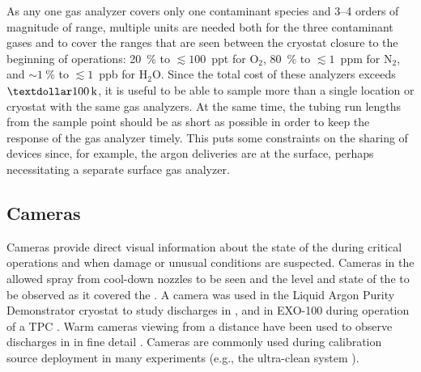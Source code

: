 As any one gas analyzer covers only one contaminant species and \numrange{3}{4} orders of magnitude of range, multiple units are needed both for the three contaminant gases and to cover the ranges that are seen between the cryostat closure to the beginning of  operations:
\SI{20}{\percent} to $\lesssim 100$~ppt for $\text{O}_2$,
\SI{80}{\percent} to $\lesssim 1$~ppm for $\text{N}_2$, and
$\sim \SI{1}{\percent}$ to $\lesssim 1$~ppb for $\text{H}_2\text{O}$.
Since the total cost of these analyzers exceeds $\SI{100}[\textdollar]{k}$, it is useful to be able to  sample more than a single location or cryostat with the same gas analyzers. At the same time, the tubing run lengths from the sample point should be as short as possible in order to keep the response of the gas analyzer timely. This puts some constraints on the sharing of devices since, for example, the argon deliveries are at the surface, perhaps necessitating a separate surface gas analyzer.


\subsection{Cameras}

Cameras provide direct visual information about the state of the
 during critical operations and when damage or unusual
conditions are suspected.  Cameras in the  allowed spray from cool-down
nozzles to be seen and the level and state of the \lar to be
observed as it covered the  \cite{Murphy:20170516}.  A camera was
used in the Liquid Argon Purity Demonstrator
cryostat\cite{Adamowski:2014daa} to study  discharges in
\lar, and in EXO-100 during operation of a TPC
\cite{Delaquis:2013hva}.  Warm cameras viewing \lar from a distance
have been used to observe  discharges in \lar in
fine detail \cite{Auger:2015xlo}.  Cameras are commonly used during
calibration source deployment in many experiments (e.g., the
\kamland ultra-clean system \cite{Banks:2014hra}).

